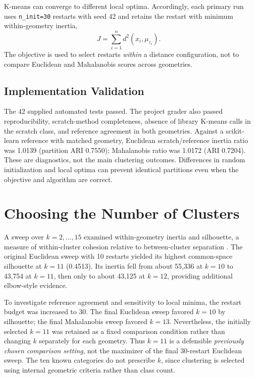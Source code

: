 \documentclass[conference]{IEEEtran}
\begin{document}
K-means can converge to different local optima. Accordingly, each primary run uses \texttt{n\_init=30} restarts with seed 42 and retains the restart with minimum within-geometry inertia,
\begin{equation}
 J=\sum_{i=1}^{n}d^2(x_i,\mu_{z_i}).
\end{equation}
The objective is used to select restarts \emph{within} a distance configuration, not to compare Euclidean and Mahalanobis scores across geometries.

\subsection{Implementation Validation}
The 42 supplied automated tests passed. The project grader also passed reproducibility, scratch-method completeness, absence of library K-means calls in the scratch class, and reference agreement in both geometries. Against a scikit-learn reference with matched geometry, Euclidean scratch/reference inertia ratio was 1.0139 (partition ARI 0.7550); Mahalanobis ratio was 1.0172 (ARI 0.7204). These are diagnostics, not the main clustering outcomes. Differences in random initialization and local optima can prevent identical partitions even when the objective and algorithm are correct.

\section{Choosing the Number of Clusters}
A sweep over $k=2,\ldots,15$ examined within-geometry inertia and silhouette, a measure of within-cluster cohesion relative to between-cluster separation \cite{rousseeuw1987}. The original Euclidean sweep with 10 restarts yielded its highest common-space silhouette at $k=11$ (0.4513). Its inertia fell from about 55,336 at $k=10$ to 43,754 at $k=11$, then only to about 43,125 at $k=12$, providing additional elbow-style evidence.

To investigate reference agreement and sensitivity to local minima, the restart budget was increased to 30. The final Euclidean sweep favored $k=10$ by silhouette; the final Mahalanobis sweep favored $k=13$. Nevertheless, the initially selected $k=11$ was retained as a fixed comparison condition rather than changing $k$ separately for each geometry. Thus $k=11$ is a defensible \emph{previously chosen comparison setting}, not the maximizer of the final 30-restart Euclidean sweep. The ten known categories do not prescribe $k$, since clustering is selected using internal geometric criteria rather than class count.
\end{document}
